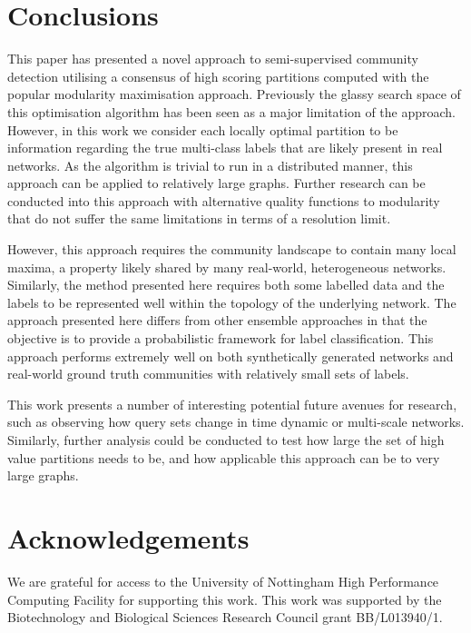\documentclass[sigconf]{acmart}
\begin{document}
\section{Conclusions}
This paper has presented a novel approach to semi-supervised community detection utilising a consensus of high scoring partitions computed with the popular modularity maximisation approach.
Previously the glassy search space of this optimisation algorithm has been seen as a major limitation of the approach.
However, in this work we consider each locally optimal partition to be information regarding the true multi-class labels that are likely present in real networks.
As the algorithm is trivial to run in a distributed manner, this approach can be applied to relatively large graphs.
Further research can be conducted into this approach with alternative quality functions to modularity that do not suffer the same limitations in terms of a resolution limit.

However, this approach requires the community landscape to contain many local maxima, a property likely shared by many real-world, heterogeneous networks.
Similarly, the method presented here requires both some labelled data and the labels to be represented well within the topology of the underlying network.
The approach presented here differs from other ensemble approaches in that the objective is to provide a probabilistic framework for label classification.
This approach performs extremely well on both synthetically generated networks and real-world ground truth communities with relatively small sets of labels.

This work presents a number of interesting potential future avenues for research, such as observing how query sets change in time dynamic or multi-scale networks.
Similarly, further analysis could be conducted to test how large the set of high value partitions needs to be, and how applicable this approach can be to very large graphs.

\section*{Acknowledgements}
We are grateful for access to the University of Nottingham High Performance Computing Facility for supporting this work.
This work was supported by the Biotechnology and Biological Sciences Research Council grant BB/L013940/1.

 


\end{document}
